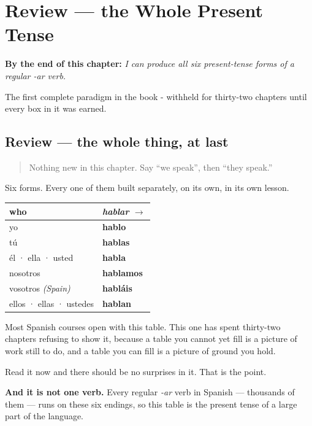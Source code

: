 
\chapter{Review --- the Whole Present Tense}
\label{ch:spanish-review-present-complete}

\begin{chapteropening}
\textbf{By the end of this chapter:} \emph{I can produce all six present-tense forms of a regular -ar verb.}

The first complete paradigm in the book - withheld for thirty-two chapters until every box in it was earned.
\end{chapteropening}

\section[Practice]{Review — the whole thing, at last}

\label{lesson:ES-C07-repaso-presente-completo}



\begin{quote}
Nothing new in this chapter. Say \textquotedblleft{}we speak\textquotedblright{}, then \textquotedblleft{}they speak.\textquotedblright{}
\end{quote}

\begin{grammarlens}[title={Grammar Lens: the table this book has been withholding}]
Six forms. Every one of them built separately, on its own, in its own lesson.

\noindent
\begin{tabularx}{\linewidth}{@{}>{\raggedright\arraybackslash}X>{\raggedright\arraybackslash}X@{}}
\toprule
\textbf{who} & \textbf{\emph{hablar} $\to$} \\
\midrule
yo & \textbf{hablo} \\
tú & \textbf{hablas} \\
él · ella · usted & \textbf{habla} \\
nosotros & \textbf{hablamos} \\
vosotros \emph{(Spain)} & \textbf{habláis} \\
ellos · ellas · ustedes & \textbf{hablan} \\
\bottomrule
\end{tabularx}

Most Spanish courses open with this table. This one has spent thirty-two chapters refusing to show it, because a table you cannot yet fill is a picture of work still to do, and a table you can fill is a picture of ground you hold.

Read it now and there should be no surprises in it. That is the point.

\textbf{And it is not one verb.} Every regular \emph{-ar} verb in Spanish — thousands of them — runs on these six endings, so this table is the present tense of a large part of the language.
\end{grammarlens}

